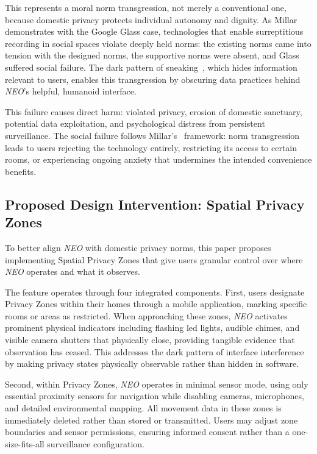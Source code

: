 \documentclass{ieee-portfolio}
\newcommand{\neo}{\textit{NEO}}
\begin{document}
This represents a moral norm transgression, not merely a conventional one, because domestic privacy protects individual autonomy and dignity. As Millar~\cite{millar_social_2020} demonstrates with the Google Glass case, technologies that enable surreptitious recording in social spaces violate deeply held norms: the existing norms came into tension with the designed norms, the supportive norms were absent, and Glass suffered social failure. The dark pattern of sneaking~\cite{gray_dark_2018}, which hides information relevant to users, enables this transgression by obscuring data practices behind \neo{}'s helpful, humanoid interface.

This failure causes direct harm: violated privacy, erosion of domestic sanctuary, potential data exploitation, and psychological distress from persistent surveillance. The social failure follows Millar's~\cite{millar_social_2020} framework: norm transgression leads to users rejecting the technology entirely, restricting its access to certain rooms, or experiencing ongoing anxiety that undermines the intended convenience benefits.

\subsection{Proposed Design Intervention: Spatial Privacy Zones}

To better align \neo{} with domestic privacy norms, this paper proposes implementing Spatial Privacy Zones that give users granular control over where \neo{} operates and what it observes.

The feature operates through four integrated components. First, users designate Privacy Zones within their homes through a mobile application, marking specific rooms or areas as restricted. When approaching these zones, \neo{} activates prominent physical indicators including flashing \gls{led} lights, audible chimes, and visible camera shutters that physically close, providing tangible evidence that observation has ceased. This addresses the dark pattern of interface interference~\cite{gray_dark_2018} by making privacy states physically observable rather than hidden in software.

Second, within Privacy Zones, \neo{} operates in minimal sensor mode, using only essential proximity sensors for navigation while disabling cameras, microphones, and detailed environmental mapping. All movement data in these zones is immediately deleted rather than stored or transmitted. Users may adjust zone boundaries and sensor permissions, ensuring informed consent rather than a one-size-fits-all surveillance configuration.
\end{document}
